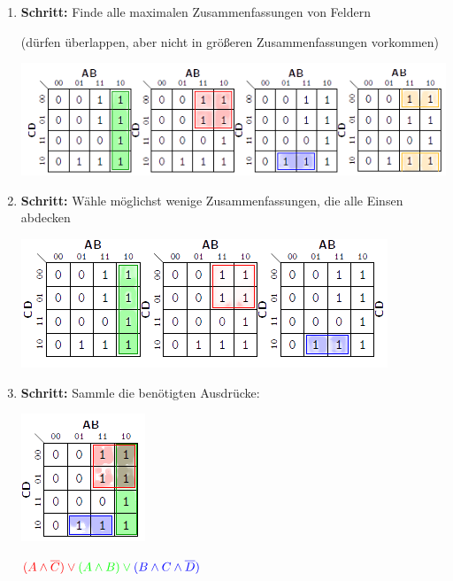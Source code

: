 \documentclass[12pt]{report}
\begin{document}
\begin{enumerate}
  \item \textbf{Schritt:}
        Finde alle maximalen Zusammenfassungen von Feldern
        
        (dürfen überlappen, aber nicht in größeren Zusammenfassungen vorkommen)
        
        \begin{center}
          \includegraphics[scale=1]{karnaugh-veitch-step_01}
        \end{center}
        
        
  \item \textbf{Schritt:}
        Wähle möglichst wenige Zusammenfassungen, die alle Einsen abdecken
        
        \begin{center}
          \includegraphics[scale=1]{karnaugh-veitch-step_02}
        \end{center}
        
        
  \item \textbf{Schritt:}
        Sammle die benötigten Ausdrücke:
        
        \includegraphics[scale=1]{karnaugh-veitch-step_03}
        
        \begin{math}
          \color{red}{(A \wedge \overline{C})}
          \vee \color{green}{(A \wedge B)}
          \vee \color{blue}{(B \wedge C \wedge \overline{D})}
        \end{math}
\end{enumerate}
\end{document}

